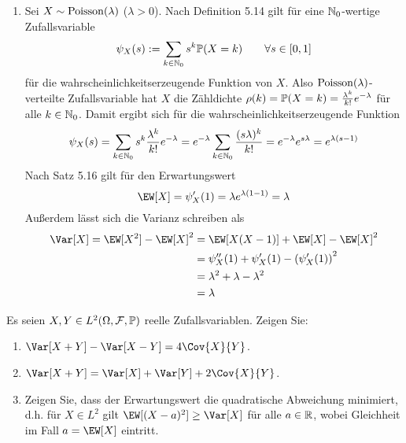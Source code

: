 \begin{exercisePage}
	\begin{enumerate}[leftmargin=*, label=(zu \alph*)]
		\item Sei $X \sim \Poisson(\lambda)$ ($\lambda > 0$). Nach Definition 5.14 gilt für eine $\N_0$-wertige Zufallsvariable
		\begin{equation*}
			\psi_X(s) \defeq \sum_{k \in \N_0} s^k \P(X = k) \qquad \forall s \in [0,1]
		\end{equation*}
		für die wahrscheinlichkeitserzeugende Funktion von $X$. Also $\Poisson(\lambda)$-verteilte Zufallsvariable hat $X$ die Zähldichte $\rho(k) = \P(X = k) = \frac{\lambda^k}{k!} e^{-\lambda}$ für alle $k \in \N_0$. Damit ergibt sich für die wahrscheinlichkeitserzeugende Funktion
		\begin{equation*}
			\psi_X(s) = \sum_{k \in \N_0} s^k \frac{\lambda^k}{k!} e^{-\lambda} = e^{- \lambda} \sum_{k \in \N_0} \frac{(s\lambda)^k}{k!} = e^{- \lambda} e^{s \lambda} = e^{\lambda (s-1)}
		\end{equation*}
		Nach Satz 5.16 gilt für den Erwartungswert
		\begin{equation*}
			\EW[X] = \psi_X'(1) = \lambda e^{\lambda(1-1)} = \lambda
		\end{equation*}
		Außerdem lässt sich die Varianz schreiben als
		\begin{equation*}
		\begin{aligned}
			\Var[X] = \EW[X^2] - \EW[X]^2 &= \EW[X(X-1)] + \EW[X] - \EW[X]^2 \\
			&= \psi_X''(1) + \psi_X'(1) - \left( \psi_X'(1) \right)^2 \\
			&= \lambda^2 + \lambda - \lambda^2 \\
			&= \lambda
		\end{aligned}
		\end{equation*}
	\end{enumerate}

	\begin{homework}
		Es seien $X,Y \in L^2(\Omega, \ereignisF, \P)$ reelle Zufallsvariablen. Zeigen Sie:
		\begin{enumerate}[leftmargin=*]
			\item $\Var[X+Y] - \Var[X-Y] = 4\Cov{X}{Y}$.
			\item $\Var[X+Y] = \Var[X] + \Var[Y] + 2 \Cov{X}{Y}$. 
			\item Zeigen Sie, dass der Erwartungswert die quadratische Abweichung minimiert, d.h. für $X \in L^2$ gilt $\EW[(X-a)^2] \ge \Var[X]$ für alle $a \in \R$, wobei Gleichheit im Fall $a = \EW[X]$ eintritt.
		\end{enumerate}
	\end{homework}


\end{exercisePage}
